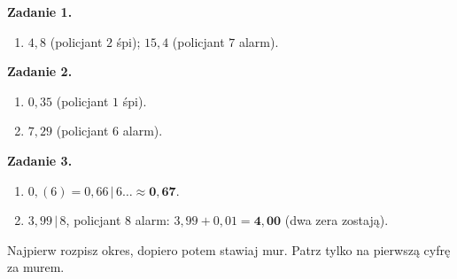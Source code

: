 \documentclass[11pt,a4paper]{article}
\begin{document}

\vspace{0.6em}
\textbf{Zadanie 1.}
\begin{enumerate}[label=\alph*), leftmargin=*, itemsep=4pt]
  \item $4{,}8$ (policjant $2$ śpi); $15{,}4$ (policjant $7$ alarm).
\end{enumerate}

\textbf{Zadanie 2.}
\begin{enumerate}[label=\alph*), leftmargin=*, itemsep=4pt]
  \item $0{,}35$ (policjant $1$ śpi).
  \item $7{,}29$ (policjant $6$ alarm).
\end{enumerate}

\textbf{Zadanie 3.}
\begin{enumerate}[label=\alph*), leftmargin=*, itemsep=4pt]
  \item $0{,}(6)=0{,}66\,|\,6\ldots\approx\mathbf{0{,}67}$.
  \item $3{,}99\,|\,8$, policjant $8$ alarm: $3{,}99+0{,}01=\mathbf{4{,}00}$ (dwa zera zostają).
\end{enumerate}

\vspace{0.6em}
\begin{tcolorbox}[colback=white, colframe=okres, boxrule=0.6pt, arc=2pt, title=Wskazówka dla Pawła]
Najpierw rozpisz okres, dopiero potem stawiaj mur. Patrz tylko na pierwszą cyfrę za murem.
\end{tcolorbox}
\end{document}
